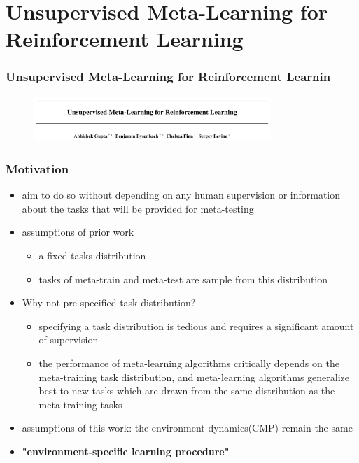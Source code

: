 \documentclass[aspectratio=169]{beamer}
\newcommand{\xmark}{\ding{55}}%
\begin{document}
\section{Unsupervised Meta-Learning for Reinforcement Learning}
\begin{frame}
  \frametitle{Unsupervised Meta-Learning for Reinforcement Learnin}
  \begin{figure}
    \includegraphics[width=0.8\textwidth]{imgs/UML_tittle.png}
  \end{figure}
\end{frame}


\begin{frame}
  \frametitle{Motivation}
  \begin{itemize}
    \item aim to do so without depending on any human supervision or information about the tasks that will be provided for meta-testing
    \item assumptions of prior work \xmark
    \begin{itemize}
      \item a fixed tasks distribution
      \item tasks of meta-train and meta-test are sample from this distribution
    \end{itemize}
    \item Why not pre-specified task distribution?
    \begin{itemize}
      \item specifying a task distribution is tedious and requires a significant amount of supervision
      \item the performance of meta-learning algorithms critically depends on the meta-training task distribution, and meta-learning algorithms generalize best to new tasks which are drawn from the same distribution as the meta-training tasks
    \end{itemize}
    \item assumptions of this work: the environment dynamics(CMP) remain the same
    \item \textbf{"environment-specific learning procedure"}
  \end{itemize}
\end{frame}
\end{document}
